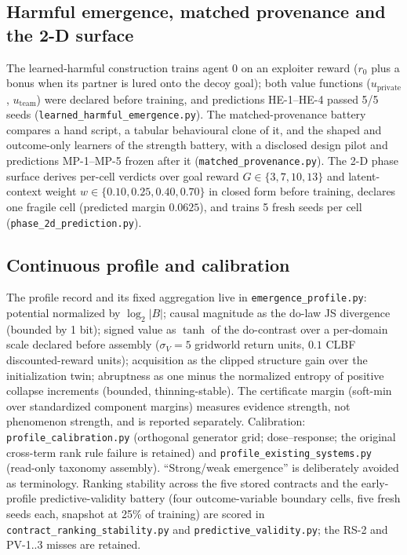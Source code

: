 \documentclass[11pt]{article}
\theoremstyle{definition}
\begin{document}
\subsection*{Harmful emergence, matched provenance and the 2-D surface}
The learned-harmful construction trains agent 0 on an exploiter reward
($r_0$ plus a bonus when its partner is lured onto the decoy goal);
both value functions ($u_{\mathrm{private}}$, $u_{\mathrm{team}}$)
were declared before training, and predictions HE-1--HE-4 passed 5/5
seeds (\texttt{learned\_harmful\_emergence.py}). The
matched-provenance battery compares a hand script, a tabular
behavioural clone of it, and the shaped and outcome-only learners of
the strength battery, with a disclosed design pilot and predictions
MP-1--MP-5 frozen after it (\texttt{matched\_provenance.py}). The 2-D
phase surface derives per-cell verdicts over goal reward
$G\in\{3,7,10,13\}$ and latent-context weight
$w\in\{0.10,0.25,0.40,0.70\}$ in closed form before training, declares
one fragile cell (predicted margin $0.0625$), and trains 5 fresh seeds
per cell (\texttt{phase\_2d\_prediction.py}).

\subsection*{Continuous profile and calibration}
The profile record and its fixed aggregation live in
\texttt{emergence\_profile.py}: potential normalized by
$\log_2 |B|$; causal magnitude as the do-law JS divergence (bounded
by 1 bit); signed value as $\tanh$ of the do-contrast over a
per-domain scale declared before assembly ($\sigma_V = 5$ gridworld
return units, $0.1$ CLBF discounted-reward units); acquisition as the
clipped structure gain over the initialization twin; abruptness as one
minus the normalized entropy of positive collapse increments (bounded,
thinning-stable). The certificate margin (soft-min over standardized
component margins) measures evidence strength, not phenomenon
strength, and is reported separately. Calibration:
\texttt{profile\_calibration.py} (orthogonal generator grid;
dose--response; the original cross-term rank rule failure is retained)
and \texttt{profile\_existing\_systems.py} (read-only taxonomy
assembly). ``Strong/weak emergence'' is deliberately avoided as
terminology. Ranking stability across the five stored contracts and
the early-profile predictive-validity battery (four outcome-variable
boundary cells, five fresh seeds each, snapshot at 25\% of training)
are scored in \texttt{contract\_ranking\_stability.py} and
\texttt{predictive\_validity.py}; the RS-2 and PV-1..3 misses are
retained.
\end{document}
